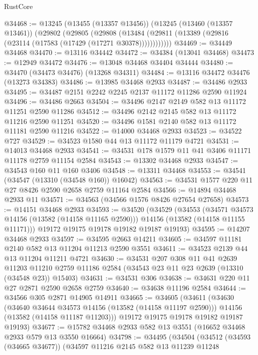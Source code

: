 \begin{lexlean}{RustCore}
\begin{coremodule}
@34468 := @13245
    (@13455 (@13357 @13456))
    (@13245
      (@13460 (@13357 @13461))
      (@29802
        (@29805
          (@29808 (@13484 (@29811 (@13389 (@29816 (@23114 (@17583 (@17429 (@17271 @30378))))))))))))
@34469 := @34449 @34468
@34470 := @13116 @34442
@34472 := @34384 (@13041 @34468)
@34473 := @12949 @34472
@34476 := @13048 @34468 @34404 @34444
@34480 := @34470 (@34473 @34476) (@13268 @34311)
@34484 := @13116 @34472 @34476 (@13273 @34383)
@34486 := @13985 @34468 @2933
@34487 := @34486 @2933
@34495 := @34487 @2151 @2242 @2245 @2137 @11172 @11286 @2590 @11924
@34496 := @34486 @2663
@34504 := @34496 @2147 @2149 @582 @13 @11172 @11251 @2590 @11286
@34512 := @34496 @2142 @2145 @582 @13 @11172 @11216 @2590 @11251
@34520 := @34496 @1581 @2140 @582 @13 @11172 @11181 @2590 @11216
@34522 := @14000 @34468 @2933
@34523 := @34522 @727
@34529 := @34523 @1580 @44 @13 @11172 @11179 @4721
@34531 := @14013 @34468 @2933
@34541 := @34531 @178 @1579 @11 @41 @3406 @11171 @11178 @2759 @11154 @2584
@34543 := @13302 @34468 @2933
@34547 := @34543 @160 @11 @160 @3406
@34548 := @13311 @34468
@34553 := @34541 (@34547 (@13310 (@34548 @160)) @16042)
@34563 := @34531 @1577 @220 @11 @27 @8426 @2590 @2658 @2759 @11164 @2584
@34566 := @14894 @34468 @2933 @11
@34571 := @34563 (@34566 @1576 @8426 @27654 @27658)
@34573 := @14151 @34468 @2933
@34593 := @34520
    (@34529
      (@34553
        (@34571 @34573 @14156 (@13582 (@14158 @11165 @2590)))
        @14156
        (@13582 (@14158 @11155 @11171)))
      @19172
      @19175
      @19178
      @19182
      @19187
      @19193)
@34595 := @14207 @34468 @2933
@34597 := @34595 @2663 @14211
@34605 := @34597 @11181 @2140 @582 @13 @11204 @11213 @2590 @3551
@34611 := @34523 @2139 @44 @13 @11204 @11211 @4721
@34630 := @34531
    @207
    @308
    @11
    @41
    @2639
    @11203
    @11210
    @2759
    @11186
    @2584
    (@34543 @23 @11 @23 @2639 (@13310 (@34548 @23)) @15403)
@34631 := @34531 @306
@34638 := @34631 @220 @11 @27 @2871 @2590 @2658 @2759
@34640 := @34638 @11196 @2584
@34644 := @34566 @305 @2871 @14905 @14911
@34665 := @34605
    (@34611
      (@34630
        (@34640 @34644 @34573 @14156 (@13582 (@14158 @11197 @2590)))
        @14156
        (@13582 (@14158 @11187 @11203)))
      @19172
      @19175
      @19178
      @19182
      @19187
      @19193)
@34677 := @15782 @34468 @2933 @582 @13 @3551 (@16652 @34468 @2933 @579 @13 @3550 @16664)
@34798 := @34495
    (@34504
      (@34512
        (@34593 (@34665 @34677))
        (@34597
          @11216
          @2145
          @582
          @13
          @11239
          @11248

\end{coremodule}
\end{lexlean}
